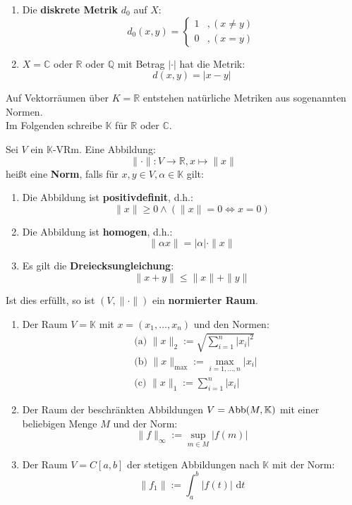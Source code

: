 \documentclass[parskip,a4paper,twoside,DIV15,BCOR12mm]{scrbook}
\begin{document}
\begin{example}
\begin{enumerate}
\item Die \textbf{diskrete Metrik} $d_0$ auf $X$:
\[d_0(x,y)=\begin{cases}
1&,(x\ne y)\\
0&,(x=y)
\end{cases}
\]
\item $X=\mathbb{C}$ oder $\mathbb{R}$ oder $\mathbb{Q}$ mit Betrag $|\cdot|$ hat die
Metrik:
\[d(x,y)=|x-y|\]
\end{enumerate}
Auf Vektorräumen über $K=\mathbb{R}$ entstehen natürliche Metriken aus sogenannten Normen.\\
Im Folgenden schreibe $\mathbb{K}$ für $\mathbb{R}$ oder $\mathbb{C}$.
\end{example}

\begin{definition}
Sei $V$ ein $\mathbb{K}$-VRm. Eine Abbildung:
\[\|\cdot\|:V\to\mathbb{R},x\mapsto \|x\|\]
heißt eine \textbf{Norm}, falls für $x,y\in V,\alpha\in\mathbb{K}$ gilt:
\begin{enumerate}
\item Die Abbildung ist \textbf{positivdefinit}, d.h.:
\[\|x\|\ge 0 \wedge (\|x\|=0\iff x=0)\]
\item Die Abbildung ist \textbf{homogen}, d.h.:
\[\|\alpha x\| = |\alpha|\cdot \|x\|\]
\item Es gilt die \textbf{Dreiecksungleichung}:
\[\|x+y\|\le\|x\|+\|y\|\]
\end{enumerate}
Ist dies erfüllt, so ist $(V,\|\cdot\|)$ ein \textbf{normierter Raum}.
\end{definition}

\begin{example}
\begin{enumerate}
\item Der Raum $V=\mathbb{K}$ mit $x=(x_1,\ldots,x_n)$ und den Normen:
\begin{align*}
&\text{(a) }\|x\|_2:=\sqrt{\sum_{i=1}^n |x_i|^2}\\
&\text{(b) }\|x\|_{\max}:= \max_{i=1,\ldots,n}|x_i|\\
&\text{(c) }\|x\|_1:=\sum_{i=1}^n |x_i|
\end{align*}
\item Der Raum der beschränkten Abbildungen $V=\operatorname{Abb}(M,\mathbb{K})$ mit einer 
beliebigen Menge $M$ und der Norm:
\[\|f\|_\infty := \sup_{m\in M}|f(m)|\]
\item Der Raum $V=C[a,b]$ der stetigen Abbildungen nach $\mathbb{K}$ mit der Norm:
\[\|f_1\|:=\int_a^b |f(t)|\text{ d}t\]
\end{enumerate}
\end{example}
\end{document}
